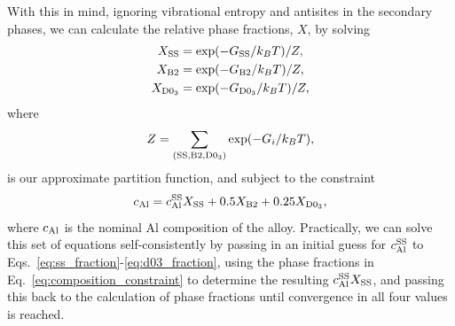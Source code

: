 With this in mind, ignoring vibrational entropy and antisites in the secondary phases, we can calculate the relative phase fractions, $X$, by solving
%
\begin{eqnarray}
    X_{\mathrm{SS}} &= \exp(-G_{\mathrm{SS}} / k_B T) / Z, \label{eq:ss_fraction} \\
    X_{\mathrm{B}2} &= \exp(-G_{\mathrm{B}2} / k_B T) / Z, \label{eq:b2_fraction} \\
    X_{\mathrm{D}0_3} &= \exp(-G_{\mathrm{D}0_3} / k_B T) / Z, \label{eq:d03_fraction}
\end{eqnarray}
%
where
\begin{equation}
    \label{eq:partition}
    Z = \sum_{(\mathrm{SS}, {\mathrm{B}2}, {\mathrm{D}0_3})} \exp(-G_i / k_B T),
\end{equation}
%
is our approximate partition function, and subject to the constraint
\begin{equation}
    \label{eq:composition_constraint}
    c_{\mathrm{Al}} = c_{\mathrm{Al}}^{\mathrm{SS}} X_{\mathrm{SS}} + 0.5 X_{{\mathrm{B}2}} + 0.25 X_{{\mathrm{D}0_3}},
\end{equation}
where $c_{\mathrm{Al}}$ is the nominal Al composition of the alloy.
Practically, we can solve this set of equations self-consistently by passing in an initial guess for $c_{\mathrm{Al}}^{\mathrm{SS}}$ to Eqs.~\ref{eq:ss_fraction}-\ref{eq:d03_fraction}, using the phase fractions in Eq.~\ref{eq:composition_constraint} to determine the resulting $c_{\mathrm{Al}}^{\mathrm{SS}} X_{\mathrm{SS}}$, and passing this back to the calculation of phase fractions until convergence in all four values is reached.

